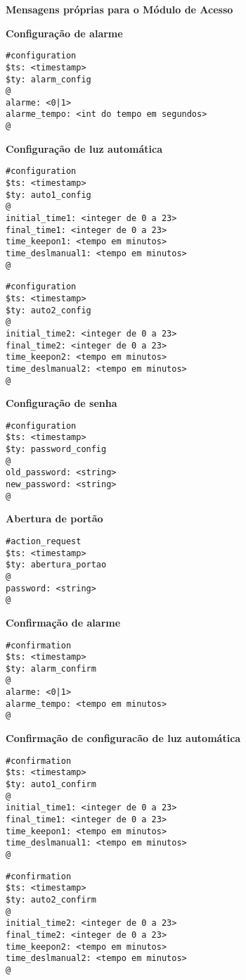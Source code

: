 \textbf{Mensagens próprias para o Módulo de Acesso}


\textbf{Configuração de alarme}
\begin{lstlisting}
#configuration
$ts: <timestamp>
$ty: alarm_config
@
alarme: <0|1>
alarme_tempo: <int do tempo em segundos>
@
\end{lstlisting}

\textbf{Configuração de luz automática}
\begin{lstlisting}
#configuration
$ts: <timestamp>
$ty: auto1_config
@
initial_time1: <integer de 0 a 23>
final_time1: <integer de 0 a 23>
time_keepon1: <tempo em minutos>
time_deslmanual1: <tempo em minutos>
@
\end{lstlisting}

\begin{lstlisting}
#configuration
$ts: <timestamp>
$ty: auto2_config
@
initial_time2: <integer de 0 a 23>
final_time2: <integer de 0 a 23>
time_keepon2: <tempo em minutos>
time_deslmanual2: <tempo em minutos>
@
\end{lstlisting}

\textbf{Configuração de senha}
\begin{lstlisting}
#configuration
$ts: <timestamp>
$ty: password_config
@
old_password: <string>
new_password: <string>
@
\end{lstlisting}

\textbf{Abertura de portão}
\begin{lstlisting}
#action_request
$ts: <timestamp>
$ty: abertura_portao
@
password: <string>
@
\end{lstlisting}

\textbf{Confirmação de alarme}
\begin{lstlisting}
#confirmation
$ts: <timestamp>
$ty: alarm_confirm
@
alarme: <0|1>
alarme_tempo: <tempo em minutos>
@
\end{lstlisting}

\textbf{Confirmação de configuracão de luz automática}
\begin{lstlisting}
#confirmation
$ts: <timestamp>
$ty: auto1_confirm
@
initial_time1: <integer de 0 a 23>
final_time1: <integer de 0 a 23>
time_keepon1: <tempo em minutos>
time_deslmanual1: <tempo em minutos>
@
\end{lstlisting}

\begin{lstlisting}
#confirmation
$ts: <timestamp>
$ty: auto2_confirm
@
initial_time2: <integer de 0 a 23>
final_time2: <integer de 0 a 23>
time_keepon2: <tempo em minutos>
time_deslmanual2: <tempo em minutos>
@
\end{lstlisting}

